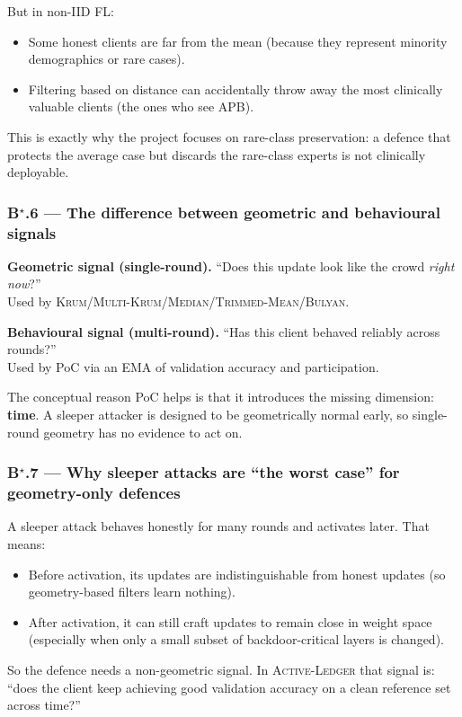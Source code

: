 \documentclass[11pt,a4paper]{article}
\newcommand{\actledger}{\textsc{Active-Ledger}\xspace}
\newcommand{\krum}{\textsc{Krum}\xspace}
\newcommand{\mkrum}{\textsc{Multi-Krum}\xspace}
\newcommand{\median}{\textsc{Median}\xspace}
\newcommand{\tmean}{\textsc{Trimmed-Mean}\xspace}
\newcommand{\bulyan}{\textsc{Bulyan}\xspace}
\begin{document}
But in non-IID FL:
\begin{itemize}
\item Some honest clients are far from the mean (because they represent minority demographics or rare cases).
\item Filtering based on distance can accidentally throw away the most clinically valuable clients (the ones who see APB).
\end{itemize}

This is exactly why the project focuses on rare-class preservation: a defence
that protects the average case but discards the rare-class experts is not
clinically deployable.

\subsubsection{B$^\star$.6 --- The difference between geometric and behavioural signals}
\textbf{Geometric signal (single-round).} ``Does this update look like the crowd \emph{right now}?''\\
Used by \krum/\mkrum/\median/\tmean/\bulyan.

\textbf{Behavioural signal (multi-round).} ``Has this client behaved reliably across rounds?''\\
Used by PoC via an EMA of validation accuracy and participation.

The conceptual reason PoC helps is that it introduces the missing dimension:
\textbf{time}. A sleeper attacker is designed to be geometrically normal early,
so single-round geometry has no evidence to act on.

\subsubsection{B$^\star$.7 --- Why sleeper attacks are ``the worst case'' for geometry-only defences}
A sleeper attack behaves honestly for many rounds and activates later.
That means:
\begin{itemize}
\item Before activation, its updates are indistinguishable from honest updates (so geometry-based filters learn nothing).
\item After activation, it can still craft updates to remain close in weight space (especially when only a small subset of backdoor-critical layers is changed).
\end{itemize}

So the defence needs a non-geometric signal. In \actledger that signal is:
``does the client keep achieving good validation accuracy on a clean reference set across time?''
\end{document}

